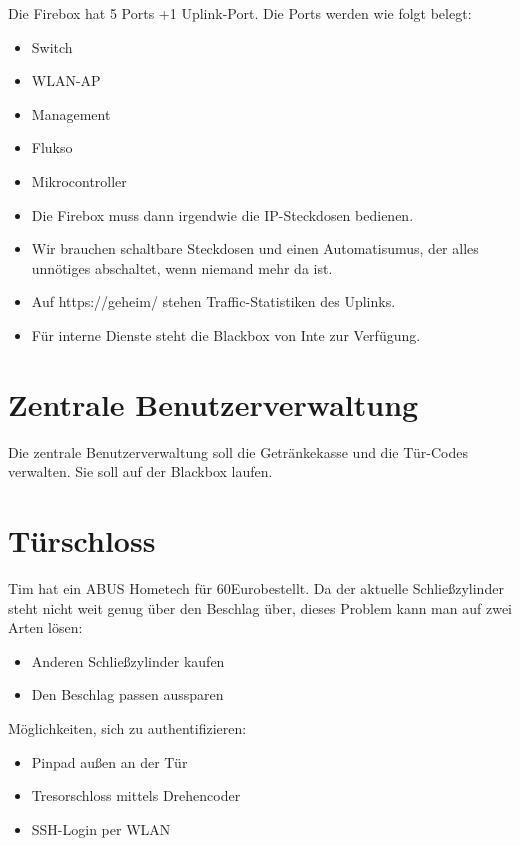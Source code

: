 \documentclass[parskip]{scrartcl}
\newcommand\euro{Euro}
\begin{document}
Die Firebox hat 5 Ports +1 Uplink-Port. Die Ports werden wie folgt belegt:
\begin{itemize}
\item{} Switch
\item{} WLAN-AP
\item{} Management
\item{} Flukso
\item{} Mikrocontroller
\end{itemize}

\begin{itemize}
\item{} Die Firebox muss dann irgendwie die IP-Steckdosen bedienen.
\item{} Wir brauchen schaltbare Steckdosen und einen Automatisumus, der alles unnötiges abschaltet, wenn niemand mehr da ist.
\item{} Auf https://geheim/ stehen Traffic-Statistiken des Uplinks.
\item{} Für interne Dienste steht die Blackbox von Inte zur Verfügung.
\end{itemize}

\section{Zentrale Benutzerverwaltung}

Die zentrale Benutzerverwaltung soll die Getränkekasse und die Tür-Codes verwalten.
Sie soll auf der Blackbox laufen.

\section{Türschloss}

Tim hat ein ABUS Hometech für 60\euro bestellt.
Da der aktuelle Schließzylinder steht nicht weit genug über den Beschlag über, dieses Problem kann man auf zwei Arten lösen:
\begin{itemize}
\item{} Anderen Schließzylinder kaufen
\item{} Den Beschlag passen aussparen
\end{itemize}

Möglichkeiten, sich zu authentifizieren:
\begin{itemize}
\item{} Pinpad außen an der Tür
\item{} Tresorschloss mittels Drehencoder
\item{} SSH-Login per WLAN
\end{itemize}
\end{document}

